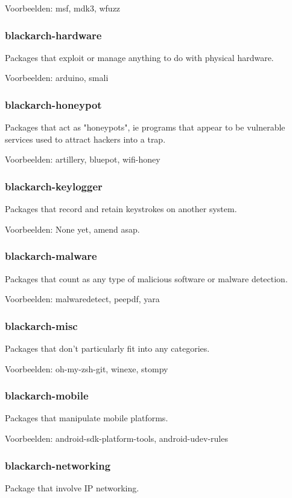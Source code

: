 \documentclass[a4paper, oneside, 11pt]{book}
\begin{document}
Voorbeelden: msf, mdk3, wfuzz

\subsubsection{blackarch-hardware}
Packages that exploit or manage anything to do with
physical hardware.

Voorbeelden: arduino, smali

\subsubsection{blackarch-honeypot}
Packages that act as "honeypots", ie programs that appear to
be vulnerable services used to attract hackers into a trap.

Voorbeelden: artillery, bluepot, wifi-honey

\subsubsection{blackarch-keylogger}
Packages that record and retain keystrokes on another system.

Voorbeelden: None yet, amend asap.

\subsubsection{blackarch-malware}
Packages that count as any type of malicious software or
malware detection.

Voorbeelden: malwaredetect, peepdf, yara

\subsubsection{blackarch-misc}
Packages that don't particularly fit into any categories.

Voorbeelden: oh-my-zsh-git, winexe, stompy

\subsubsection{blackarch-mobile}
Packages that manipulate mobile platforms.

Voorbeelden: android-sdk-platform-tools, android-udev-rules

\subsubsection{blackarch-networking}
Package that involve IP networking.
\end{document}
